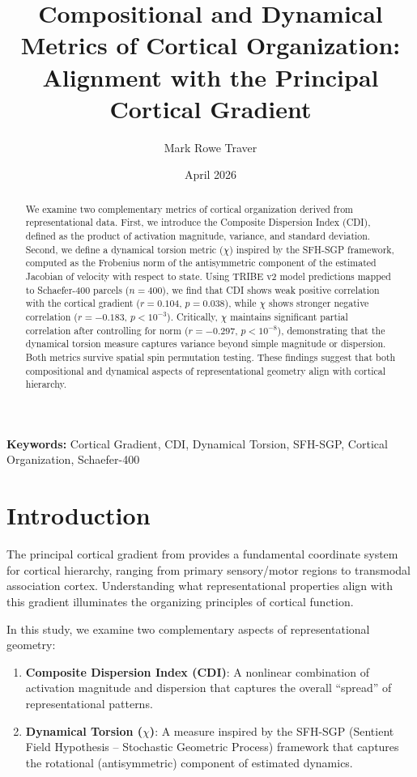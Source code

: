 \documentclass[11pt]{article}
\title{Compositional and Dynamical Metrics of Cortical Organization:\\Alignment with the Principal Cortical Gradient}
\author[1]{Mark Rowe Traver}
\affil[1]{Independent Researcher}
\date{April 2026}
\begin{document}
\maketitle

\begin{abstract}
	We examine two complementary metrics of cortical organization derived from representational data. First, we introduce the Composite Dispersion Index (CDI), defined as the product of activation magnitude, variance, and standard deviation. Second, we define a dynamical torsion metric ($\chi$) inspired by the SFH-SGP framework, computed as the Frobenius norm of the antisymmetric component of the estimated Jacobian of velocity with respect to state. Using TRIBE v2 model predictions mapped to Schaefer-400 parcels ($n = 400$), we find that CDI shows weak positive correlation with the cortical gradient ($r = 0.104$, $p = 0.038$), while $\chi$ shows stronger negative correlation ($r = -0.183$, $p < 10^{-3}$). Critically, $\chi$ maintains significant partial correlation after controlling for norm ($r = -0.297$, $p < 10^{-8}$), demonstrating that the dynamical torsion measure captures variance beyond simple magnitude or dispersion. Both metrics survive spatial spin permutation testing. These findings suggest that both compositional and dynamical aspects of representational geometry align with cortical hierarchy.
\end{abstract}

\textbf{Keywords:} Cortical Gradient, CDI, Dynamical Torsion, SFH-SGP, Cortical Organization, Schaefer-400

\section{Introduction}

The principal cortical gradient from \citet{Margulies2016} provides a fundamental coordinate system for cortical hierarchy, ranging from primary sensory/motor regions to transmodal association cortex. Understanding what representational properties align with this gradient illuminates the organizing principles of cortical function.

In this study, we examine two complementary aspects of representational geometry:

\begin{enumerate}
	\item \textbf{Composite Dispersion Index (CDI)}: A nonlinear combination of activation magnitude and dispersion that captures the overall ``spread'' of representational patterns.
	\item \textbf{Dynamical Torsion ($\chi$)}: A measure inspired by the SFH-SGP (Sentient Field Hypothesis -- Stochastic Geometric Process) framework that captures the rotational (antisymmetric) component of estimated dynamics.
\end{enumerate}
\end{document}
